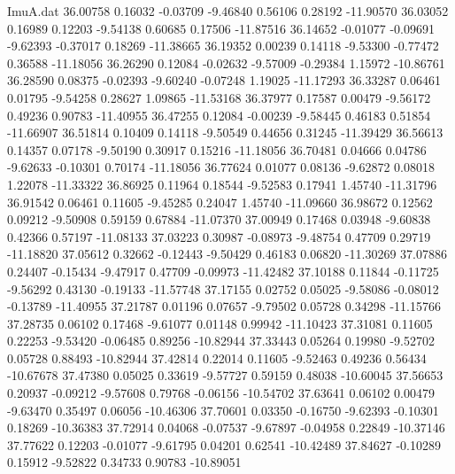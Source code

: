 \begin{filecontents}{ImuA.dat}
  36.00758    0.16032   -0.03709   -9.46840    0.56106    0.28192  -11.90570
  36.03052    0.16989    0.12203   -9.54138    0.60685    0.17506  -11.87516
  36.14652   -0.01077   -0.09691   -9.62393   -0.37017    0.18269  -11.38665
  36.19352    0.00239    0.14118   -9.53300   -0.77472    0.36588  -11.18056
  36.26290    0.12084   -0.02632   -9.57009   -0.29384    1.15972  -10.86761
  36.28590    0.08375   -0.02393   -9.60240   -0.07248    1.19025  -11.17293
  36.33287    0.06461    0.01795   -9.54258    0.28627    1.09865  -11.53168
  36.37977    0.17587    0.00479   -9.56172    0.49236    0.90783  -11.40955
  36.47255    0.12084   -0.00239   -9.58445    0.46183    0.51854  -11.66907
  36.51814    0.10409    0.14118   -9.50549    0.44656    0.31245  -11.39429
  36.56613    0.14357    0.07178   -9.50190    0.30917    0.15216  -11.18056
  36.70481    0.04666    0.04786   -9.62633   -0.10301    0.70174  -11.18056
  36.77624    0.01077    0.08136   -9.62872    0.08018    1.22078  -11.33322
  36.86925    0.11964    0.18544   -9.52583    0.17941    1.45740  -11.31796
  36.91542    0.06461    0.11605   -9.45285    0.24047    1.45740  -11.09660
  36.98672    0.12562    0.09212   -9.50908    0.59159    0.67884  -11.07370
  37.00949    0.17468    0.03948   -9.60838    0.42366    0.57197  -11.08133
  37.03223    0.30987   -0.08973   -9.48754    0.47709    0.29719  -11.18820
  37.05612    0.32662   -0.12443   -9.50429    0.46183    0.06820  -11.30269
  37.07886    0.24407   -0.15434   -9.47917    0.47709   -0.09973  -11.42482
  37.10188    0.11844   -0.11725   -9.56292    0.43130   -0.19133  -11.57748
  37.17155    0.02752    0.05025   -9.58086   -0.08012   -0.13789  -11.40955
  37.21787    0.01196    0.07657   -9.79502    0.05728    0.34298  -11.15766
  37.28735    0.06102    0.17468   -9.61077    0.01148    0.99942  -11.10423
  37.31081    0.11605    0.22253   -9.53420   -0.06485    0.89256  -10.82944
  37.33443    0.05264    0.19980   -9.52702    0.05728    0.88493  -10.82944
  37.42814    0.22014    0.11605   -9.52463    0.49236    0.56434  -10.67678
  37.47380    0.05025    0.33619   -9.57727    0.59159    0.48038  -10.60045
  37.56653    0.20937   -0.09212   -9.57608    0.79768   -0.06156  -10.54702
  37.63641    0.06102    0.00479   -9.63470    0.35497    0.06056  -10.46306
  37.70601    0.03350   -0.16750   -9.62393   -0.10301    0.18269  -10.36383
  37.72914    0.04068   -0.07537   -9.67897   -0.04958    0.22849  -10.37146
  37.77622    0.12203   -0.01077   -9.61795    0.04201    0.62541  -10.42489
  37.84627   -0.10289    0.15912   -9.52822    0.34733    0.90783  -10.89051

\end{filecontents}
